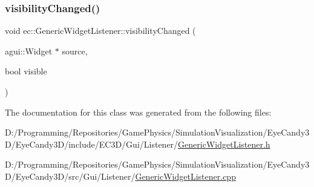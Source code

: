 \mbox{\label{classec_1_1_generic_widget_listener_a6f9e7db28e619ab8c538152972fe6c97}} 
\subsubsection{\texorpdfstring{visibility\+Changed()}{visibilityChanged()}}
{\footnotesize\ttfamily void ec\+::\+Generic\+Widget\+Listener\+::visibility\+Changed (\begin{DoxyParamCaption}\item[{agui\+::\+Widget $\ast$}]{source,  }\item[{bool}]{visible }\end{DoxyParamCaption})\hspace{0.3cm}{\ttfamily [override]}}



The documentation for this class was generated from the following files\+:\begin{DoxyCompactItemize}
\item 
D\+:/\+Programming/\+Repositories/\+Game\+Physics/\+Simulation\+Visualization/\+Eye\+Candy3\+D/\+Eye\+Candy3\+D/include/\+E\+C3\+D/\+Gui/\+Listener/\mbox{\hyperlink{_generic_widget_listener_8h}{Generic\+Widget\+Listener.\+h}}\item 
D\+:/\+Programming/\+Repositories/\+Game\+Physics/\+Simulation\+Visualization/\+Eye\+Candy3\+D/\+Eye\+Candy3\+D/src/\+Gui/\+Listener/\mbox{\hyperlink{_generic_widget_listener_8cpp}{Generic\+Widget\+Listener.\+cpp}}\end{DoxyCompactItemize}
